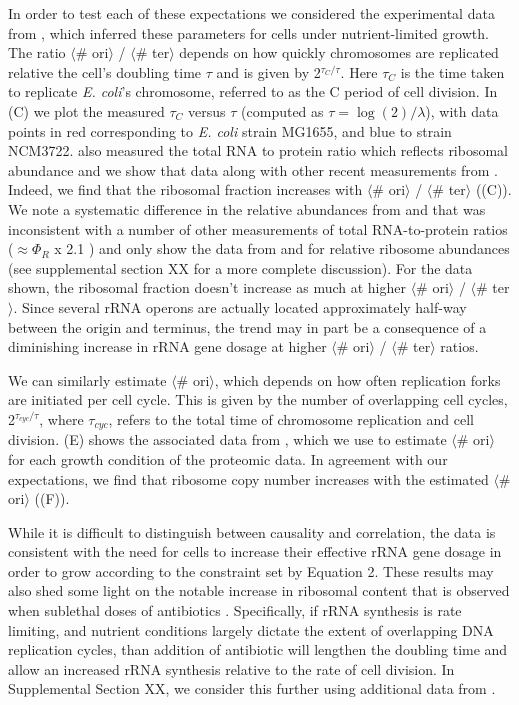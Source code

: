 In order to test each of these expectations we considered the experimental data
from \cite{si2017}, which inferred these parameters for cells under
nutrient-limited growth. The ratio $\langle$\# ori$\rangle$ / $\langle$\#
ter$\rangle$ depends on how quickly chromosomes are replicated relative the
cell's doubling time $\tau$ and is given by 2$^{\tau_C / \tau}$. Here $\tau_C$
is the time taken to replicate \textit{E. coli}'s chromosome, referred to as the
C period of cell division.  In (C) we plot the
measured $\tau_C$ versus $\tau$ (computed as $\tau = \log (2) / \lambda$), with
data points in red corresponding to \textit{E. coli} strain MG1655, and blue to
strain NCM3722. \cite{si2017} also measured the total RNA to protein ratio which
reflects ribosomal abundance and we show that data along with other recent
measurements from \cite{dai2016,dai2018}. Indeed, we find that the ribosomal
fraction increases with $\langle$\# ori$\rangle$ / $\langle$\# ter$\rangle$
((C)). We note a systematic difference in the
relative abundances from \cite{peebo2015} and \cite{valgepea2013} that was
inconsistent with a number of other measurements of total RNA-to-protein ratios
($\approx \Phi_R$ x 2.1 \cite{dai2016}) and only show the data from
\cite{schmidt2016} and \cite{li2014} for relative ribosome abundances (see
supplemental section XX for a more complete discussion). For the data shown, the
ribosomal fraction doesn't increase as much at higher $\langle$\# ori$\rangle$ /
$\langle$\# ter$\rangle$. Since several rRNA operons are actually located
approximately half-way between the origin and terminus, the trend may in part be
a consequence of a diminishing increase in rRNA gene dosage at higher
$\langle$\# ori$\rangle$ / $\langle$\# ter$\rangle$ ratios.

We can similarly estimate $\langle$\# ori$\rangle$, which depends on how often
replication forks are initiated per cell cycle. This is given by the number of
overlapping cell cycles,  2$^{\tau_{cyc} / \tau}$, where $\tau_{cyc}$, refers to
the total time of chromosome replication and cell division.
(E) shows the associated data from \cite{si2019},
which we use to estimate $\langle$\# ori$\rangle$  for each growth condition of
the proteomic data. In agreement with our expectations, we find that ribosome
copy number increases with the estimated $\langle$\# ori$\rangle$
((F)).

While it is difficult to distinguish between causality and correlation, the data
is consistent with the need for cells to increase their effective rRNA gene
dosage in order to grow according to the constraint set by Equation 2. These
results may also shed some light on the notable increase in ribosomal content
that is observed when sublethal doses of antibiotics \citep{scott2010, dai2016}.
Specifically, if rRNA synthesis is rate limiting, and nutrient conditions
largely dictate the extent of overlapping DNA replication cycles, than addition
of antibiotic will lengthen the doubling time and allow an increased rRNA
synthesis relative to the rate of cell division. In Supplemental Section XX, we
consider this further using additional data from \cite{si2017}.

